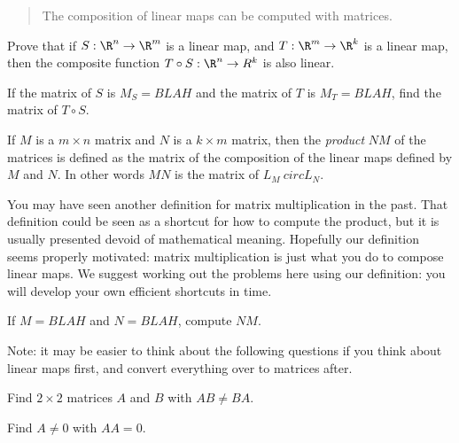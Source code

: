 \documentclass{article}
\begin{document}
\begin{abstract}
  The composition of linear maps can be computed with matrices.
\end{abstract}

\begin{question}
  Prove that if $S:\R^n \to \R^m$ is a linear map, and $T:\R^m \to \R^k$ is a linear map, then the composite function $T\circ S:\R^n \to R^k$ is also linear.

  \begin{free-response}
  \end{free-response}
\end{question}
	
\begin{question}
  If the matrix of $S$ is $M_S = BLAH$ and the matrix of $T$ is $M_T = BLAH$, find the matrix of $T \circ S$.
\end{question}
	
\begin{definition}
  If $M$ is a $m\times n$ matrix and $N$ is a $k \times m$ matrix, then the \textit{product} $NM$ of the matrices is
  defined as the matrix of the composition of the linear maps defined by $M$ and $N$.  In other words  $MN$ is the matrix of 
  $L_M\ circ L_N$.
\end{definition}

\begin{warning}
  You may have seen another definition for matrix multiplication in
  the past.  That definition could be seen as a shortcut for how to
  compute the product, but it is usually presented devoid of
  mathematical meaning.  Hopefully our definition seems properly
  motivated: matrix multiplication is just what you do to compose
  linear maps.  We suggest working out the problems here using our
  definition: you will develop your own efficient shortcuts in time.
\end{warning}

\begin{question}
  If $M = BLAH$ and $N=BLAH$, compute $NM$.
\end{question}
	
Note:  it may be easier to think about the following questions if you think about linear maps first, and convert everything over to matrices after.

\begin{question}
  Find $2\times 2$ matrices $A$ and $B$ with $AB \neq BA$.
\end{question}
	
\begin{question}
  Find $A \neq 0$  with $AA = 0$.
\end{question}
	
\end{document}
